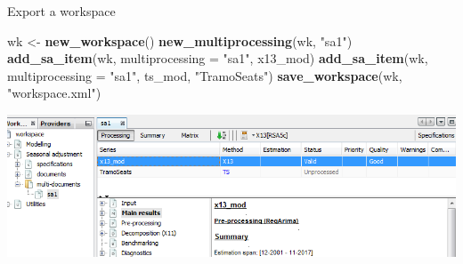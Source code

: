 \documentclass[10pt,xcolor=table,color={dvipsnames,usenames},ignorenonframetext,usepdftitle=false,french]{beamer}
\newenvironment{Shaded}{\begin{snugshade}}{\end{snugshade}}
\newcommand{\KeywordTok}[1]{\textcolor[rgb]{0.13,0.29,0.53}{\textbf{#1}}}
\newcommand{\DataTypeTok}[1]{\textcolor[rgb]{0.13,0.29,0.53}{#1}}
\newcommand{\StringTok}[1]{\textcolor[rgb]{0.31,0.60,0.02}{#1}}
\newcommand{\NormalTok}[1]{#1}
\begin{document}
\begin{frame}[fragile]{Export a workspace}

\footnotesize

\begin{Shaded}
\begin{Highlighting}[]
\NormalTok{wk <-}\StringTok{ }\KeywordTok{new_workspace}\NormalTok{()}
\KeywordTok{new_multiprocessing}\NormalTok{(wk, }\StringTok{"sa1"}\NormalTok{)}
\KeywordTok{add_sa_item}\NormalTok{(wk, }\DataTypeTok{multiprocessing =} \StringTok{"sa1"}\NormalTok{,}
\NormalTok{            x13_mod)}
\KeywordTok{add_sa_item}\NormalTok{(wk, }\DataTypeTok{multiprocessing =} \StringTok{"sa1"}\NormalTok{,}
\NormalTok{            ts_mod, }\StringTok{"TramoSeats"}\NormalTok{)}
\KeywordTok{save_workspace}\NormalTok{(wk, }\StringTok{"workspace.xml"}\NormalTok{)}
\end{Highlighting}
\end{Shaded}

\includegraphics{img/workspace.png}

\end{frame}
\end{document}
